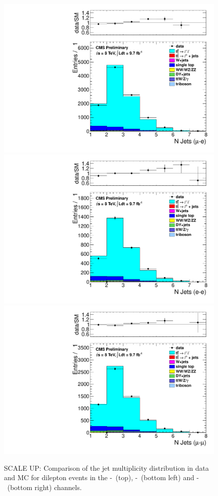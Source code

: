 \begin{figure}[hbt]
  \begin{center}
        \includegraphics[width=0.5\linewidth]{plots/njets_all_met50_mueg_scaleup.pdf}
        \includegraphics[width=0.5\linewidth]{plots/njets_all_met50_diel_scaleup.pdf}%
        \includegraphics[width=0.5\linewidth]{plots/njets_all_met50_dimu_scaleup.pdf}
        \caption{
          \label{fig:dileptonnjets_scaleup}%
          SCALE UP: Comparison of the jet multiplicity distribution in data and MC for dilepton events in the \E-\M\
          (top), \E-\E\ (bottom left) and \M-\M\ (bottom right) channels.}  
      \end{center}
\end{figure}

